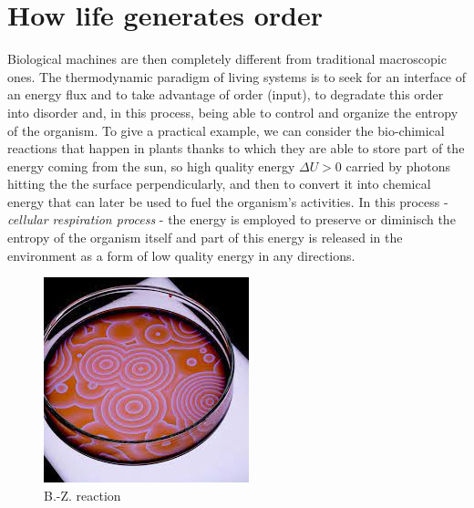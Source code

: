 \documentclass[../main/main.tex]{subfiles}
\begin{document}
\section{How life generates order}



Biological machines are then completely different from traditional macroscopic ones. The thermodynamic paradigm of living systems is to seek for an interface of an energy flux and to take advantage of order (input), to degradate this order into disorder and, in this process, being able to control and organize the entropy of the organism. 
To give a practical example, we can consider the bio-chimical reactions that happen in plants thanks to which they are able to store part of the energy coming from the sun, so high quality energy $\Delta U>0$ carried by photons hitting the the surface perpendicularly, and then to convert it into chemical energy that can later be used to fuel the organism's activities. 
In this process - \emph{cellular respiration process} - the energy is employed to preserve or diminisch the entropy of the organism itself and part of this energy is released in the environment as a form of low quality energy in any directions.

\begin{figure}
    \centering
    \includegraphics[width=0.8\linewidth]{../frontespizio/tikz/1_lesson/Belousov-Zhabotinsky reaction.jpeg}
    \caption{B.-Z. reaction\cite{nat_geo}}
\end{figure}
\end{document}
